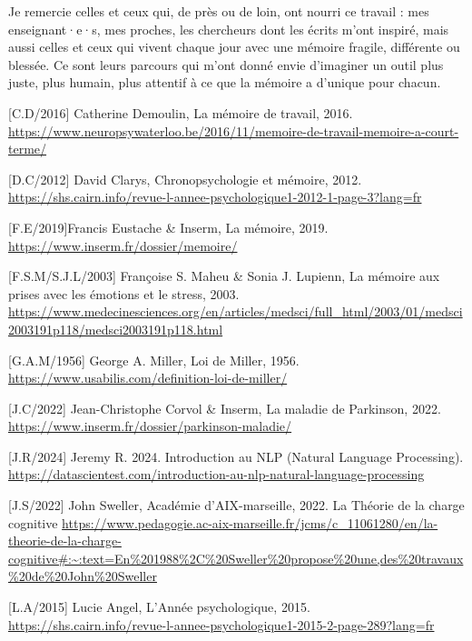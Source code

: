 \documentclass[11pt,a4paper]{report}
\begin{document}
Je remercie celles et ceux qui, de près ou de loin, ont nourri ce travail : mes enseignant·e·s, mes proches, les chercheurs dont les écrits m’ont inspiré, mais aussi celles et ceux qui vivent chaque jour avec une mémoire fragile, différente ou blessée. Ce sont leurs parcours qui m’ont donné envie d’imaginer un outil plus juste, plus humain, plus attentif à ce que la mémoire a d’unique pour chacun.

\begin{thebibliography}{9}

        [C.D/2016] Catherine Demoulin, La mémoire de travail, 2016. \break
        \url{https://www.neuropsywaterloo.be/2016/11/memoire-de-travail-memoire-a-court-terme/}
    
        [D.C/2012]  David Clarys, Chronopsychologie et mémoire, 2012. \break
        \url{https://shs.cairn.info/revue-l-annee-psychologique1-2012-1-page-3?lang=fr}

        [F.E/2019]Francis Eustache \& Inserm, La mémoire, 2019. \break
        \url{https://www.inserm.fr/dossier/memoire/}

        [F.S.M/S.J.L/2003] Françoise S. Maheu \& Sonia J. Lupienn, La mémoire aux prises avec les émotions et le stress, 2003. \break
        \url{https://www.medecinesciences.org/en/articles/medsci/full_html/2003/01/medsci2003191p118/medsci2003191p118.html}

        [G.A.M/1956] George A. Miller, Loi de Miller, 1956. \break
        \url{https://www.usabilis.com/definition-loi-de-miller/}
    
        [J.C/2022] Jean-Christophe Corvol \& Inserm, La maladie de Parkinson, 2022. \break
        \url{https://www.inserm.fr/dossier/parkinson-maladie/}
    
        [J.R/2024] Jeremy R. 2024. Introduction au NLP (Natural Language Processing). \break
        \url{https://datascientest.com/introduction-au-nlp-natural-language-processing}
    
        [J.S/2022] John Sweller, Académie d'AIX-marseille, 2022. La Théorie de la charge cognitive \break
        \url{https://www.pedagogie.ac-aix-marseille.fr/jcms/c_11061280/en/la-theorie-de-la-charge-cognitive#:~:text=En%201988%2C%20Sweller%20propose%20une,des%20travaux%20de%20John%20Sweller}
    
        [L.A/2015] Lucie Angel, L'Année psychologique, 2015. \break
        \url{https://shs.cairn.info/revue-l-annee-psychologique1-2015-2-page-289?lang=fr}
    

\end{thebibliography}
\end{document}
